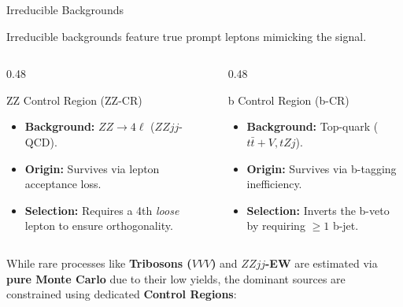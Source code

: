 \begin{frame}{Irreducible Backgrounds}
    
    Irreducible backgrounds feature true prompt leptons mimicking the signal.     
    \vspace{0.1cm}
    
    \begin{columns}[T]
        
        \begin{column}{0.48\textwidth}
            \begin{block}{ZZ Control Region (ZZ-CR)}
                \begin{itemize}
                    \item \textbf{Background:} $ZZ \to 4\ell$ ($ZZjj$-QCD).
                    \item \textbf{Origin:} Survives via lepton acceptance loss.
                    \item \textbf{Selection:} Requires a 4th \textit{loose} lepton to ensure orthogonality.
                \end{itemize}
            \end{block}
        \end{column}
        
        \begin{column}{0.48\textwidth}
            \begin{block}{b Control Region (b-CR)}
                \begin{itemize}
                    \item \textbf{Background:} Top-quark ($t\bar{t}+V, tZj$).
                    \item \textbf{Origin:} Survives via b-tagging inefficiency.
                    \item \textbf{Selection:} Inverts the b-veto by requiring $\ge 1$ b-jet.
                \end{itemize}
            \end{block}
        \end{column}
        
    \end{columns}
    \vspace{0.4cm}
    While rare processes like \textbf{Tribosons ($VVV$)} and \textbf{$ZZjj$-EW} are estimated via \textbf{pure Monte Carlo} due to their low yields, the dominant sources are constrained using dedicated \textbf{Control Regions}:


\end{frame}

